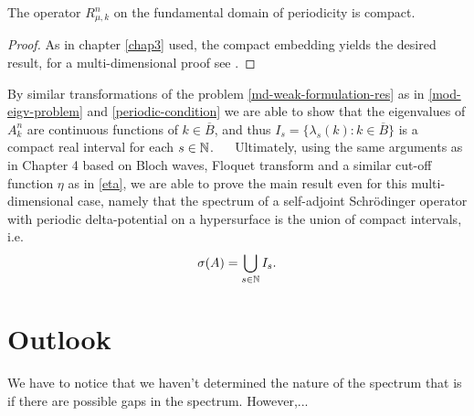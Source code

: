\begin{theorem}
	The operator $R_{\mu, k}^{n}$ on the fundamental domain of periodicity is compact.	

	\begin{proof}
		As in chapter \ref{chap3} used, the compact embedding yields the desired result, for a multi-dimensional proof see \cite[Chap. 4]{Adams}.	
	\end{proof}
\end{theorem}

By similar transformations of the problem \eqref{md-weak-formulation-res} as in \eqref{mod-eigv-problem} and \eqref{periodic-condition} we are able to show that the eigenvalues of $A^{n}_{k}$ are continuous functions of $k \in \overline{B}$, and thus $I_{s} = \{ \lambda_{s}(k) : k \in \overline{B} \}$ is a compact real interval for each $s \in \mathbb{N}$.
~\newline ~\newline
Ultimately, using the same arguments as in Chapter 4 based on Bloch waves, Floquet transform and a similar cut-off function $\eta$ as in \eqref{eta}, we are able to prove the main result even for this multi-dimensional case, namely that the spectrum of a self-adjoint Schrödinger operator with periodic delta-potential on a hypersurface is the union of compact intervals, i.e.
	\[ \sigma(A) = \bigcup_{s \in \mathbb{N}} I_{s}. \]

\section{Outlook}	
	
We have to notice that we haven't determined the nature of the spectrum that is if there are possible gaps in the spectrum. However,... %